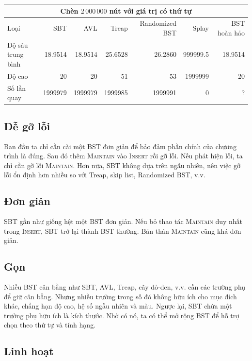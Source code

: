 \documentclass[11pt]{article}
\begin{document}
\begin{center}
\small
\setlength{\tabcolsep}{3.5pt}
\begin{tabular}{l|rrrrrr}
\multicolumn{7}{c}{Chèn $2\,000\,000$ nút với giá trị có thứ tự}\\
\hline
Loại & SBT & AVL & Treap & Randomized BST & Splay & BST hoàn hảo\\
\hline
Độ sâu trung bình & 18.9514 & 18.9514 & 25.6528 & 26.2860 & 999999.5 & 18.9514\\
Độ cao & 20 & 20 & 51 & 53 & 1999999 & 20\\
Số lần quay & 1999979 & 1999979 & 1999985 & 1999991 & 0 & ?\\
\end{tabular}
\end{center}

\subsection{Dễ gỡ lỗi}

Ban đầu ta chỉ cần cài một BST đơn giản để bảo đảm phần chính của chương trình
là đúng. Sau đó thêm \textsc{Maintain} vào \textsc{Insert} rồi gỡ lỗi. Nếu
phát hiện lỗi, ta chỉ cần gỡ lỗi \textsc{Maintain}. Hơn nữa, SBT không dựa
trên ngẫu nhiên, nên việc gỡ lỗi ổn định hơn nhiều so với Treap, skip list,
Randomized BST, v.v.

\subsection{Đơn giản}

SBT gần như giống hệt một BST đơn giản. Nếu bỏ thao tác \textsc{Maintain} duy
nhất trong \textsc{Insert}, SBT trở lại thành BST thường. Bản thân
\textsc{Maintain} cũng khá đơn giản.

\subsection{Gọn}

Nhiều BST cân bằng như SBT, AVL, Treap, cây đỏ-đen, v.v. cần các trường phụ
để giữ cân bằng. Nhưng nhiều trường trong số đó không hữu ích cho mục đích
khác, chẳng hạn độ cao, hệ số ngẫu nhiên và màu. Ngược lại, SBT chứa một
trường phụ hữu ích là kích thước. Nhờ có nó, ta có thể mở rộng BST để hỗ trợ
chọn theo thứ tự và tính hạng.

\subsection{Linh hoạt}
\end{document}

